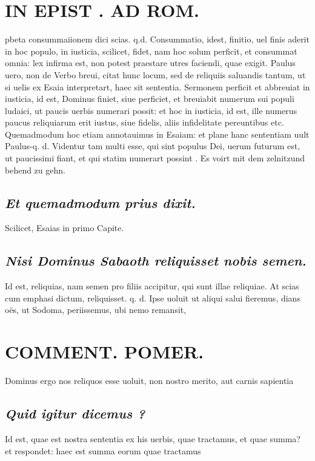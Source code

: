 \documentclass{article}
\begin{document}
\begin{pages}
\section*{IN EPIST . AD ROM.  }
\marginpar{[ p.115 ]}\pstart pbeta consummaiionem dici scias. q.d. Consummatio, idest, finitio, uel finis aderit in hoc populo, in iusticia, scilicet, fidet, nam hoc solum perficit, et consummat omnia: lex infirma est, non potest praestare utres faciendi, quae exigit. Paulus uero, non de Verbo breui, citat hunc locum, sed de reliquiis saluandis tantum, ut si uelis ex Esaia interpretart, haec sit sententia. Sermonem perficit et abbreuiat in iusticia, id est, Dominus finiet, siue perficiet, et breuiabit numerum sui populi ludaici, ut paucis uerbis numerari possit: et hoc in iusticia, id est, ille numerus paucus reliquiarum erit iustus, siue fidelis, aliis infidelitate pereuntibus etc. Quemadmodum hoc etiam annotauimus in Esaiam: et plane hanc sententiam uult Paulus-q. d. Videntur tam multi esse, qui sint populus Dei, uerum futurum est, ut paucissimi fiant, et qui statim numerart possint . Es voirt mit dem zelnitzund behend zu gehn.  \pend
{}
{}
\subsection*{\textit{Et quemadmodum prius dixit. }}\pstart Scilicet, Esaias in primo Capite.  \pend
{}
{}
\subsection*{\textit{Nisi Dominus Sabaoth reliquisset nobis semen. }}\pstart Id est, reliquias, nam semen pro filiis accipitur, qui sunt illae reliquiae. At scias cum emphasi dictum, reliquisset. q. d. Ipse uoluit ut aliqui salui fieremus, dians oës, ut Sodoma, periissemus, ubi nemo remansit,  \pend
\section*{COMMENT. POMER.  }\pstart Dominus ergo nos reliquos esse uoluit, non nostro merito, aut carnis sapientia\pend
{}
{}
\subsection*{\textit{Quid igitur dicemus ? }}\pstart Id est, quae est nostra sententia ex his uerbis, quae tractamus, et quae summa? et respondet: haec est summa eorum quae tractamus  \pend
{}
{}

\end{pages}
\end{document}

